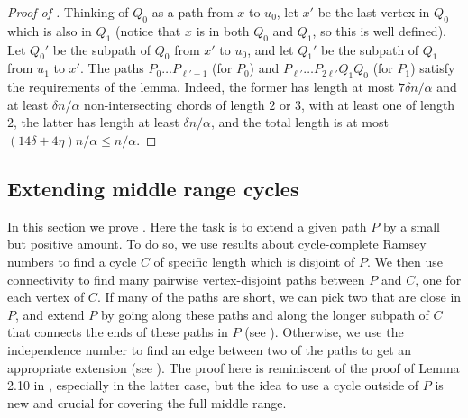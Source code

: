 \documentclass[11pt,english]{article}
\theoremstyle{plain}
\theoremstyle{definition}
\theoremstyle{remark}
\begin{document}
\begin{proof}[Proof of ]
			Thinking of $Q_0$ as a path from $x$ to $u_0$, let $x'$ be the last vertex in $Q_0$ which is also in $Q_1$ (notice that $x$ is in both $Q_0$ and $Q_1$, so this is well defined). Let $Q_0'$ be the subpath of $Q_0$ from $x'$ to $u_0$, and let $Q_1'$ be the subpath of $Q_1$ from $u_1$ to $x'$.
			The paths $P_0\ldots P_{\ell'-1}$ (for $P_0$) and $P_{\ell'}\ldots P_{2\ell'} Q_1 Q_0$ (for $P_1$) satisfy the requirements of the lemma.
			Indeed, the former has length at most $7\delta n/\alpha$ and at least $\delta n/\alpha$ non-intersecting chords of length $2$ or $3$, with at least one of length $2$, the latter has length at least $\delta n/\alpha$, and the total length is at most $(14\delta + 4\eta)n/\alpha \le n/\alpha$.
		\end{proof}
	\subsection{Extending middle range cycles}

		In this section we prove . Here the task is to extend a given path $P$ by a small but positive amount.
		To do so, we use results about cycle-complete Ramsey numbers to find a cycle $C$ of specific length which is disjoint of $P$. We then use connectivity to find many pairwise vertex-disjoint paths between $P$ and $C$, one for each vertex of $C$. 
		If many of the paths are short, we can pick two that are close in $P$, and extend $P$ by going along these paths and along the longer subpath of $C$ that connects the ends of these paths in $P$ (see ). Otherwise, we use the independence number to find an edge between two of the paths to get an appropriate extension (see ).
		The proof here is reminiscent of the proof of Lemma 2.10 in \cite{draganic2023chvatal}, especially in the latter case, but the idea to use a cycle outside of $P$ is new and crucial for covering the full middle range.
\end{document}
